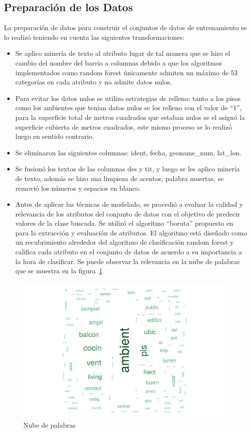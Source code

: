 \subsection{Preparación de los Datos}
La preparación de datos para construir el conjuntos de datos de entrenamiento se lo realizó teniendo en cuenta las
siguientes transformaciones:

\begin{itemize}
 \item Se aplico minería de texto al atributo lugar de tal manera que se hizo el cambio del nombre del barrio a columnas
 debido a que los algoritmos implementados como random forest únicamente admiten un máximo de 53 categorías en cada atributo
 y no admite datos nulos.
 
 \item Para evitar los datos nulos se utilizo estrategias de relleno: tanto a los pisos como los ambientes que tenían datos nulos 
 se los relleno con el valor de ``1'', para la superficie total de metros cuadrados que estaban nulos se el asignó la superficie cubierta
 de metros cuadrados, este mismo proceso se lo realizó luego en sentido contrario.
 
 \item Se eliminaron las siguientes columnas: ident, fecha, geoname\_num, lat\_lon.
 
 \item Se fusionó los textos de las columnas des y tit, y luego se les aplico minería de texto, además se hizo una limpieza
 de acentos, palabra muertas, se removió los números y espacios en blanco.
 
 \item Antes de aplicar las técnicas de modelado, se procedió a
evaluar la calidad y relevancia de los atributos del conjunto de datos
 con el objetivo de predecir valores de la clase buscada. Se
utilizó el algoritmo ``boruta'' propuesto en \cite{kursa2010feature} para la extracción y
evaluación de atributos. El algoritmo está diseñado como un recubrimiento alrededor del algoritmo de clasificación random
forest y califica cada atributo en el conjunto de datos de
acuerdo a su importancia a la hora de clasificar. Se puede observar la relevancia en la nube de palabras que se muestra
en la figura~\ref{fig:np} 
\end{itemize}

\begin{figure}
  \centering
  \includegraphics[width = 11cm]{words.png}
  \caption{Nube de palabras}
  \label{fig:np}
\end{figure}

